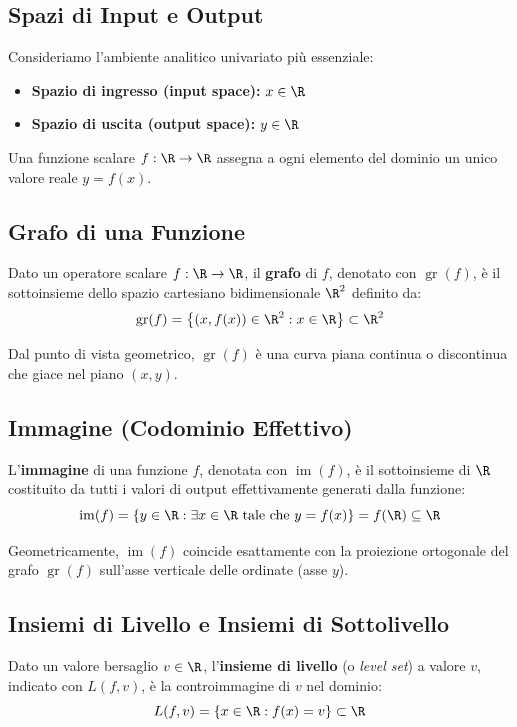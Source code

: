 \subsection{Spazi di Input e Output}
Consideriamo l'ambiente analitico univariato pi\`u essenziale:
\begin{itemize}
    \item \textbf{Spazio di ingresso (input space):} $x \in \R$
    \item \textbf{Spazio di uscita (output space):} $y \in \R$
\end{itemize}
Una funzione scalare $f: \R \to \R$ assegna a ogni elemento del dominio un unico valore reale $y = f(x)$.

\subsection{Grafo di una Funzione}
\begin{definition}[Grafo]
Dato un operatore scalare $f: \R \to \R$, il \textbf{grafo} di $f$, denotato con $\operatorname{gr}(f)$, \`e il sottoinsieme dello spazio cartesiano bidimensionale $\R^2$ definito da:
\begin{equation}
\operatorname{gr}(f) = \left\{ (x, f(x)) \in \R^2 : x \in \R \right\} \subset \R^2
\end{equation}
\end{definition}
Dal punto di vista geometrico, $\operatorname{gr}(f)$ \`e una curva piana continua o discontinua che giace nel piano $(x, y)$.

\subsection{Immagine (Codominio Effettivo)}
\begin{definition}[Immagine]
L'\textbf{immagine} di una funzione $f$, denotata con $\operatorname{im}(f)$, \`e il sottoinsieme di $\R$ costituito da tutti i valori di output effettivamente generati dalla funzione:
\begin{equation}
\operatorname{im}(f) = \left\{ y \in \R : \exists x \in \R \text{ tale che } y = f(x) \right\} = f(\R) \subseteq \R
\end{equation}
\end{definition}
Geometricamente, $\operatorname{im}(f)$ coincide esattamente con la proiezione ortogonale del grafo $\operatorname{gr}(f)$ sull'asse verticale delle ordinate (asse $y$).

\subsection{Insiemi di Livello e Insiemi di Sottolivello}
\begin{definition}
Dato un valore bersaglio $v \in \R$, l'\textbf{insieme di livello} (o \textit{level set}) a valore $v$, indicato con $L(f, v)$, \`e la controimmagine di $v$ nel dominio:
\begin{equation}
L(f, v) = \left\{ x \in \R : f(x) = v \right\} \subset \R
\end{equation}
\end{definition}

